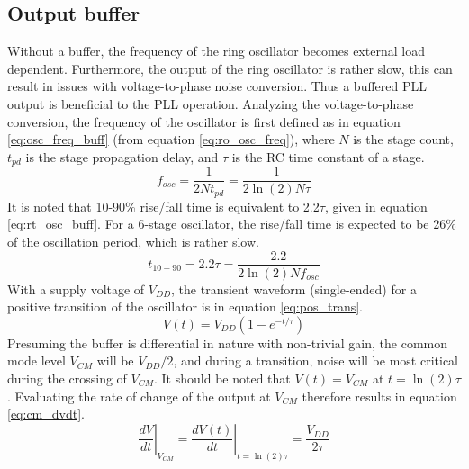 

	\FloatBarrier\pagebreak
	\subsection{Output buffer}\label{sec:buffer}
		Without a buffer, the frequency of the ring oscillator becomes external load dependent. Furthermore, the output of the ring oscillator is rather slow, this can result in issues with voltage-to-phase noise conversion. Thus a buffered PLL output is beneficial to the PLL operation. Analyzing the voltage-to-phase conversion, the frequency of the oscillator is first defined as in equation \ref{eq:osc_freq_buff} (from equation \ref{eq:ro_osc_freq}), where $N$ is the stage count, $t_{pd}$ is the stage propagation delay, and $\tau$ is the RC time constant of a stage. 
		\begin{equation}\label{eq:osc_freq_buff}
			f_{osc} = \frac{1}{2N t_{pd}} = \frac{1}{2\ln(2)N \tau}
		\end{equation}
		It is noted that 10-90\% rise/fall time is equivalent to 2.2$\tau$, given in equation \ref{eq:rt_osc_buff}. For a 6-stage oscillator, the rise/fall time is expected to be 26\% of the oscillation period, which is rather slow.
		\begin{equation}\label{eq:rt_osc_buff}
			t_{10-90} = 2.2\tau =  \frac{2.2}{2\ln(2)N f_{osc}}
		\end{equation}		
		With a supply voltage of $V_{DD}$, the transient waveform (single-ended) for a positive transition of the oscillator is in equation \ref{eq:pos_trans}.
		\begin{equation}\label{eq:pos_trans}
			V(t) =V_{DD}\left( 1 - e^{-t/\tau} \right)
		\end{equation}		
		Presuming the buffer is differential in nature with non-trivial gain, the common mode level $V_{CM}$ will be $V_{DD}/2$, and during a transition, noise will be most critical during the crossing of $V_{CM}$. It should be noted that $V(t) = V_{CM}$ at $t = \ln(2)\tau$. Evaluating the rate of change of the output at $V_{CM}$ therefore results in equation \ref{eq:cm_dvdt}.
		\begin{equation}\label{eq:cm_dvdt}
			\left.\frac{dV}{dt}\right|_{V_{CM}} = \left.\frac{dV(t)}{dt}\right|_{t= \ln(2)\tau} = \frac{V_{DD}}{2\tau}
		\end{equation}	
